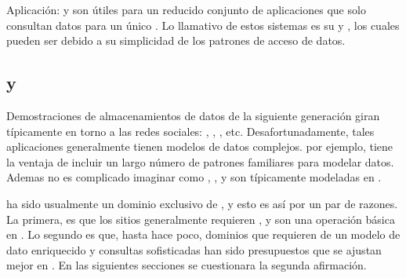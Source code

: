 Aplicación: \keyDB {} \stores y \wideColumnDB \stores son útiles para un reducido conjunto de aplicaciones que solo consultan datos para un único \keyValue. Lo llamativo de estos sistemas es su \performanceQA y \scalabilityQA, los cuales pueden ser \highly \optimized debido a su simplicidad de los patrones de acceso de datos.









\subsection{\mongodbNAME y \ecommerce \cite{online_mongodb_ecommerce}}
\label{cap:justificacion_proyecto:MongoDB_ECommerce}

Demostraciones de almacenamientos de datos de la siguiente generación giran típicamente en torno a las redes sociales: \twitterNAME, \facebook, \foursquare, etc. Desafortunadamente, tales aplicaciones generalmente tienen modelos de datos complejos. \ecommerce por ejemplo, tiene la ventaja de incluir un largo número de patrones familiares para modelar datos. Ademas no es complicado imaginar como \itemCOM, \categoriesCommerce, \itemReviewsCommerce y \ordersCommerce son típicamente modeladas en \rdbms.

\ecommerce ha sido usualmente un dominio exclusivo de \rdbms, y esto es así por un par de razones. La primera, es que los sitios \ecommerce generalmente requieren \transactionsDB, y \transactionsDB son una operación básica en \rdbms. Lo segundo es que, hasta hace poco, dominios que requieren de un modelo de dato enriquecido y consultas sofisticadas han sido presupuestos que se ajustan mejor en \rdbms. En las siguientes secciones se cuestionara la segunda afirmación. 

